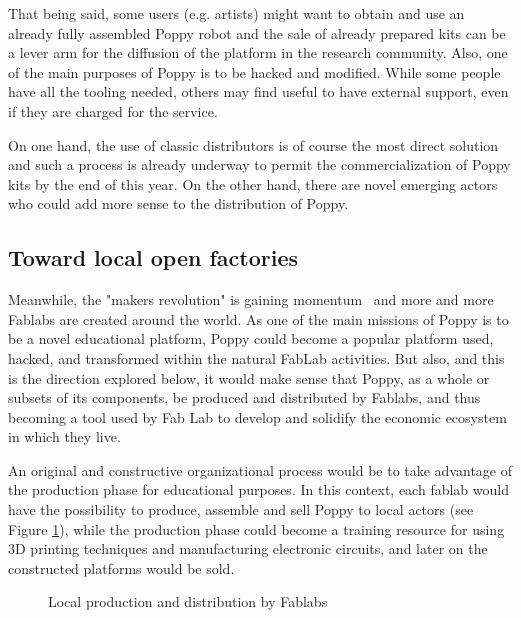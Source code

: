 That being said, some users (e.g. artists) might want to obtain and use an already fully assembled Poppy robot and the sale of already prepared kits can be a lever arm for the diffusion of the platform in the research community.
Also, one of the main purposes of Poppy is to be hacked and modified.  While some people have all the tooling needed, others may find useful to have external support, even if they are charged for the service.

On one hand, the use of classic distributors is of course the most direct solution and such a process is already underway to permit the commercialization of Poppy kits by the end of this year. On the other hand, there are novel emerging actors who could add more sense to the distribution of Poppy.


\subsection{Toward local open factories} %

Meanwhile, the "makers revolution" is gaining momentum~\parencite{anderson2012makers} and more and more Fablabs are created around the world. As one of the main missions of Poppy is to be a novel educational platform, Poppy could become a popular platform used, hacked, and transformed within the natural FabLab activities. But also, and this is the direction explored below,  it would make sense that Poppy, as a whole or subsets of its components, be produced and distributed by Fablabs, and thus becoming a tool used by Fab Lab to develop and solidify the economic ecosystem in which they live.

An original and constructive organizational process would be to take advantage of the production phase for educational purposes. In this context, each fablab would have the possibility to produce, assemble and sell Poppy to local actors (see Figure \ref{fig:world_fab}), while the production phase could become a training resource for using 3D printing techniques and manufacturing electronic circuits, and  later on the constructed platforms would be sold.

\begin{figure}[tb]
    \begin{center}

    \end{center}
    \caption{Local production and distribution by Fablabs}
    \label{fig:world_fab}
\end{figure}



